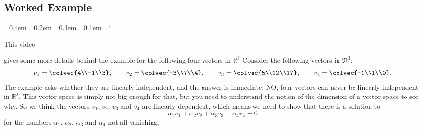 
\subsection*{Worked Example}

{\ttfamily
{}\font=0.4em
\font=0.2em
\font=0.1em
\font=0.1em
\hyphenchar\font=`\-


\hypertarget{linear_independence_example}{This video} gives some more details behind the example for the following four vectors in ${\mathbb R}^3$
Consider the following vectors in \(\Re^3\):
\[
v_1=\colvec{4\\-1\\3}, \qquad
v_2=\colvec{-3\\7\\4}, \qquad
v_3=\colvec{5\\12\\17}, \qquad
v_4=\colvec{-1\\1\\0}.
\]
The example asks whether they are linearly independent, and the answer is immediate: NO, four vectors can never be linearly independent in ${\mathbb R}^3$. This vector space is simply not big enough for that, but you need to understand the notion of the dimension of a vector space to see why.
So we think the vectors $v_1$, $v_2$, $v_3$ and $v_4$ are linearly dependent, which means we need to show that there is a solution to 
$$
\alpha_1 v_1 + \alpha_2 v_2 + \alpha_3 v_3 + \alpha_4 v_4 = 0
$$
for the numbers $\alpha_1$, $\alpha_2$, $\alpha_3$ and $\alpha_4$  not all vanishing. 

}
